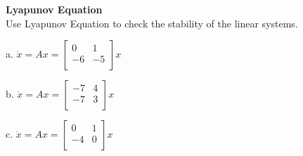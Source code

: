 \documentclass{homeworg}
\begin{document}
\exercise
\noindent
\textbf{Lyapunov Equation}\\
Use Lyapunov Equation to check the stability of the linear systems.

a. \( \dot{x} = Ax = \begin{bmatrix}
  0 & 1\\
  -6 & -5\\
\end{bmatrix} x \)

b. \( \dot{x} = Ax = \begin{bmatrix}
  -7 & 4\\
  -7 & 3\\
\end{bmatrix} x \)

c. \( \dot{x} = Ax = \begin{bmatrix}
   0 & 1\\
  -4 & 0\\
\end{bmatrix} x \)
\end{document}
